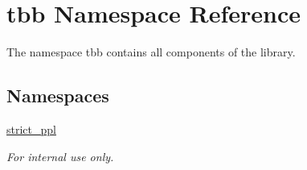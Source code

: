\hypertarget{namespacetbb}{}\section{tbb Namespace Reference}
\label{namespacetbb}


The namespace tbb contains all components of the library.  


\subsection*{Namespaces}
\begin{DoxyCompactItemize}
\item 
 \hyperlink{namespacetbb_1_1strict__ppl}{strict\+\_\+ppl}
\begin{DoxyCompactList}\small\item\em For internal use only. \end{DoxyCompactList}\end{DoxyCompactItemize}
